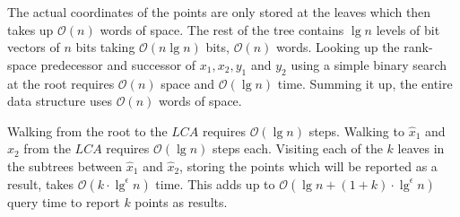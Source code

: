 
The actual coordinates of the points are only stored at the leaves which then takes up $\mathcal{O}(n)$  words of space. The rest of the tree contains $\lg n$ levels of bit vectors of $n$ bits taking $\mathcal{O}(n \lg n)$ bits, $\mathcal{O}(n)$ words. Looking up the rank-space predecessor and successor of $x_1, x_2, y_1$ and $y_2$ using a simple binary search at the root requires $\mathcal{O}(n)$ space and $\mathcal{O}(\lg n)$ time. Summing it up, the entire data structure uses $\mathcal{O}(n)$ words of space. 

Walking from the root to the $LCA$ requires $\mathcal{O}(\lg n)$ steps. Walking to $\hat{x}_1$ and $\hat{x}_2$ from the $LCA$ requires $\mathcal{O}(\lg n)$ steps each. Visiting each of the $k$ leaves in the subtrees between $\hat{x}_1$ and $\hat{x}_2$, storing the points which will be reported as a result, takes $\mathcal{O}(k \cdot \lg^\epsilon n)$ time.  This adds up to $\mathcal{O}(\lg n + (1+k)\cdot\lg^\epsilon n)$ query time to report $k$ points as results. 

